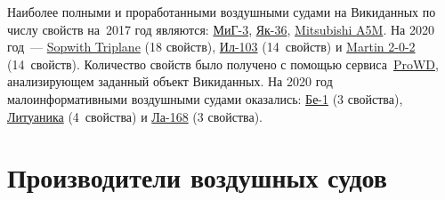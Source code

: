 
Наиболее полными и проработанными воздушными судами на Викиданных по числу свойств 
на~2017 год являются: \href{https://www.wikidata.org/wiki/Q271446}{МиГ-3}, 
\href{https://www.wikidata.org/wiki/Q1349098}{Як-36}, 
\href{https://www.wikidata.org/wiki/Q429839}{Mitsubishi A5M}. 
На 2020 год~--- \href{https://www.wikidata.org/wiki/Q770863}{Sopwith Triplane} (18 свойств), 
\href{https://www.wikidata.org/wiki/Q1658673}{Ил-103} (14~свойств) и 
\href{https://www.wikidata.org/wiki/Q665071}{Martin 2-0-2} (14~свойств).
Количество свойств было получено с помощью сервиса~\href{https://prowd.id/dashboards/972cd00ce110/profile}{ProWD}\autocite{aircraft_prowd}, 
анализирующем заданный объект Викиданных.
На 2020 год малоинформативными воздушными судами оказались: 
\href{https://www.wikidata.org/wiki/Q820603}{Бе-1} (3 свойства), 
\href{https://www.wikidata.org/wiki/Q117984}{Литуаника} (4~свойства) и 
\href{https://www.wikidata.org/wiki/Q572762}{Ла-168} (3 свойства).



\section{Производители воздушных судов}%
\marginnote{\MarginQuestion У каких из представленных ниже российских производителей самолётов есть веб-сайты?%
\begin{itemize}
\item \ruwiki{vDw}{МиГ}
\item \ruwiki{vDx}{Саратовский авиационный завод}
\item \ruwiki{vDy}{Туполев}
\item \ruwiki{vDz}{Сухой}
\end{itemize}
См. ответ %
на с.~\pageref{answer:aircraft_manufacturers}.
}

